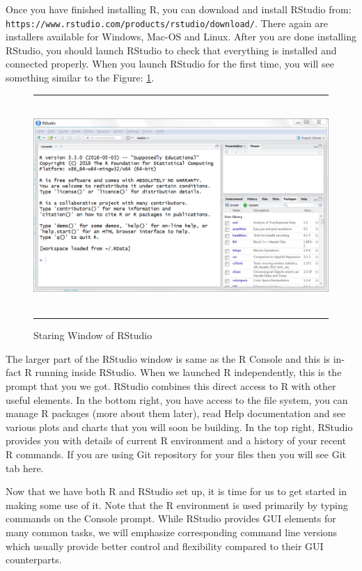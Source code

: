 \documentclass[11pt, letterpaper, twoside]{memoir}\usepackage{knitr}
\begin{document}
Once you have finished installing R, you can download and install RStudio from: \\ 
\verb|https://www.rstudio.com/products/rstudio/download/|. There again are installers available for Windows, Mac-OS and Linux. After you are done installing RStudio, you should launch RStudio to check that everything is installed and connected properly. When you launch RStudio for the first time, you will see something similar to the Figure: \ref{fig:rstudio}.

\begin{figure}
\rule{4in}{1pt}
\centering
\includegraphics[height=3in]{images/rstudio.png}
\caption{Staring Window of RStudio}
\label{fig:rstudio}
\rule{4in}{1pt}
\end{figure}

The larger part of the RStudio window is same as the R Console and this is in-fact R running inside RStudio. When we launched R independently, this is the prompt that you we got. RStudio combines this direct access to R with other useful elements. In the bottom right, you have access to the file system, you can manage R packages (more about them later), read Help documentation and see various plots and charts that you will soon be building. In the top right, RStudio provides you with details of current R environment and a history of your recent R commands. If you are using Git repository for your files then you will see Git tab here.

Now that we have both R and RStudio set up, it is time for us to get started in making some use of it. Note that the R environment is used primarily by typing commands on the Console prompt. While RStudio provides GUI elements for many common tasks, we will emphasize corresponding command line versions which usually provide better control and flexibility compared to their GUI counterparts. 
\end{document}
